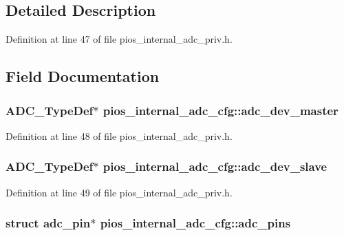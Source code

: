 \subsection{\-Detailed \-Description}


\-Definition at line 47 of file pios\-\_\-internal\-\_\-adc\-\_\-priv.\-h.



\subsection{\-Field \-Documentation}
\hypertarget{structpios__internal__adc__cfg_ac7b103c963e512c7104bbcd2b6dc3281}{
\subsubsection[{adc\-\_\-dev\-\_\-master}]{\setlength{\rightskip}{0pt plus 5cm}\-A\-D\-C\-\_\-\-Type\-Def$\ast$ {\bf pios\-\_\-internal\-\_\-adc\-\_\-cfg\-::adc\-\_\-dev\-\_\-master}}}\label{structpios__internal__adc__cfg_ac7b103c963e512c7104bbcd2b6dc3281}


\-Definition at line 48 of file pios\-\_\-internal\-\_\-adc\-\_\-priv.\-h.

\hypertarget{structpios__internal__adc__cfg_a78fcf970c586ff2dc5a5464b3eda21e6}{
\subsubsection[{adc\-\_\-dev\-\_\-slave}]{\setlength{\rightskip}{0pt plus 5cm}\-A\-D\-C\-\_\-\-Type\-Def$\ast$ {\bf pios\-\_\-internal\-\_\-adc\-\_\-cfg\-::adc\-\_\-dev\-\_\-slave}}}\label{structpios__internal__adc__cfg_a78fcf970c586ff2dc5a5464b3eda21e6}


\-Definition at line 49 of file pios\-\_\-internal\-\_\-adc\-\_\-priv.\-h.

\hypertarget{structpios__internal__adc__cfg_aab81b632bc0f9deae3f430046125c883}{
\subsubsection[{adc\-\_\-pins}]{\setlength{\rightskip}{0pt plus 5cm}struct {\bf adc\-\_\-pin}$\ast$ {\bf pios\-\_\-internal\-\_\-adc\-\_\-cfg\-::adc\-\_\-pins}}}\label{structpios__internal__adc__cfg_aab81b632bc0f9deae3f430046125c883}


